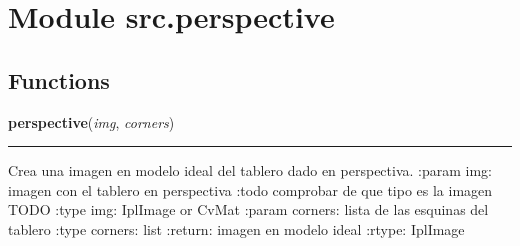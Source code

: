 %
%
%


\section{Module src.perspective}

    \label{src:perspective}


  \subsection{Functions}

    \label{src:perspective:perspective}

    \vspace{0.5ex}

\hspace{.8\funcindent}\begin{boxedminipage}{\funcwidth}

    \raggedright \textbf{perspective}(\textit{img}, \textit{corners})

    \vspace{-1.5ex}

    \rule{\textwidth}{0.5\fboxrule}
\setlength{\parskip}{2ex}

Crea una imagen en modelo ideal del tablero dado en perspectiva.
:param img: imagen con el tablero en perspectiva
:todo comprobar de que tipo es la imagen TODO
:type img: IplImage or CvMat
:param corners: lista de las esquinas del tablero
:type corners: list
:return: imagen en modelo ideal
:rtype: IplImage
\setlength{\parskip}{1ex}
    \end{boxedminipage}




